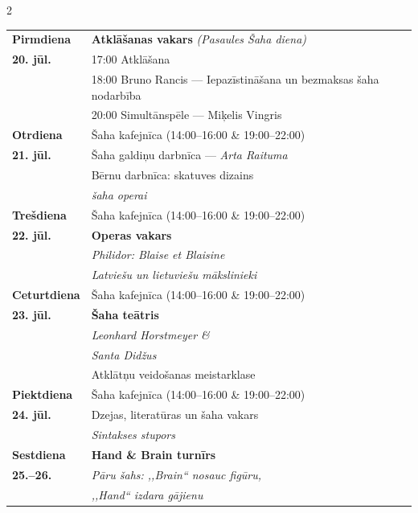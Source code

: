 \documentclass[a4paper,10pt]{article}
\begin{document}
\begin{center}
\begin{minipage}{0.87\paperwidth}
\begin{multicols}{2}
{\footnotesize\setlength{\parskip}{0pt}
\begin{tabular}{@{}p{1.55cm}p{5.5cm}@{}}
\textbf{Pirmdiena}  & \textbf{Atklāšanas vakars} \textit{(Pasaules Šaha diena)}\\
\textbf{20. jūl.}   & 17:00 Atklāšana\\
                    & 18:00 Bruno Rancis — Iepazīstināšana un bezmaksas šaha nodarbība\\
                    & 20:00 Simultānspēle — Miķelis Vingris\\[3pt]
\textbf{Otrdiena}   & Šaha kafejnīca (14:00–16:00 \& 19:00–22:00)\\
\textbf{21. jūl.}   & Šaha galdiņu darbnīca — \textit{Arta Raituma}\\
                    & Bērnu darbnīca: skatuves dizains\\
                    & \hfill\textit{šaha operai}\\[3pt]
\textbf{Trešdiena}  & Šaha kafejnīca (14:00–16:00 \& 19:00–22:00)\\
\textbf{22. jūl.}   & \textbf{Operas vakars}\\
                    & \textit{Philidor: Blaise et Blaisine}\\
                    & \textit{Latviešu un lietuviešu mākslinieki}\\[3pt]
\textbf{Ceturtdiena}& Šaha kafejnīca (14:00–16:00 \& 19:00–22:00)\\
\textbf{23. jūl.}   & \textbf{Šaha teātris}\\
                    & \textit{Leonhard Horstmeyer \&}\\
                    & \textit{Santa Did\v{z}us}\\
                    & Atklātņu veidošanas meistarklase\\[3pt]
\textbf{Piektdiena} & Šaha kafejnīca (14:00–16:00 \& 19:00–22:00)\\
\textbf{24. jūl.}   & Dzejas, literatūras un šaha vakars\\
                    & \textit{Sintakses stupors}\\[3pt]
\textbf{Sestdiena}  & \textbf{Hand \& Brain turnīrs}\\
\textbf{25.–26.}    & \textit{Pāru šahs: ,,Brain`` nosauc figūru,}\\
                    & \textit{,,Hand`` izdara gājienu}\\
\end{tabular}
}

\columnbreak


\end{multicols}
\end{minipage}
\end{center}
\end{document}

